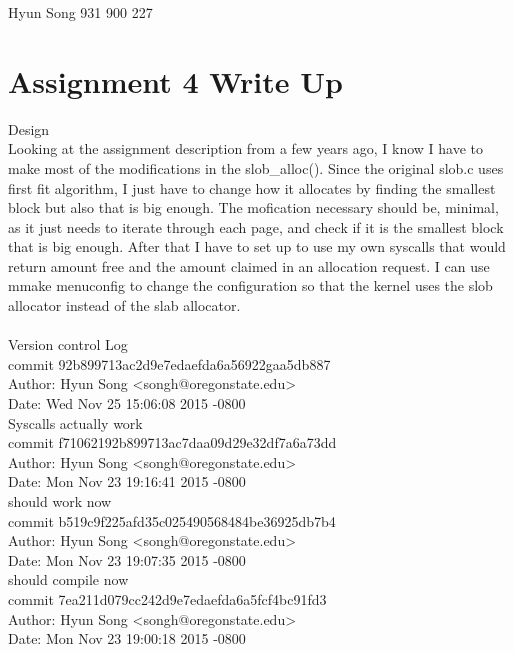 \documentclass[letterpaper,10pt]{article}
\begin{document}
Hyun Song
931 900 227

\section{Assignment 4 Write Up}
{\LARGE Design}\\
Looking at the assignment description from a few years ago, I know I have to make most of the modifications in the slob\_alloc(). Since the original slob.c uses first fit algorithm, I just have to change how it allocates by finding the smallest block but also that is big enough. The mofication necessary should be, minimal, as it just needs to iterate through each page, and check if it is the smallest block that is big enough. After that I have to set up to use my own syscalls that would return amount free and the amount claimed in an allocation request. I can use mmake menuconfig to change the configuration so that the kernel uses the slob allocator instead of the slab allocator.\\
\\



{\LARGE Version control Log}\\


commit 92b899713ac2d9e7edaefda6a56922gaa5db887\\
Author: Hyun Song <songh@oregonstate.edu>\\
Date:   Wed Nov 25 15:06:08 2015 -0800\\

    Syscalls actually work\\

commit f71062192b899713ac7daa09d29e32df7a6a73dd\\
Author: Hyun Song <songh@oregonstate.edu>\\
Date:   Mon Nov 23 19:16:41 2015 -0800\\

    should work now\\

commit b519c9f225afd35c025490568484be36925db7b4\\
Author: Hyun Song <songh@oregonstate.edu>\\
Date:   Mon Nov 23 19:07:35 2015 -0800\\

    should compile now\\

commit 7ea211d079cc242d9e7edaefda6a5fcf4bc91fd3\\
Author: Hyun Song <songh@oregonstate.edu>\\
Date:   Mon Nov 23 19:00:18 2015 -0800\\
\end{document}
